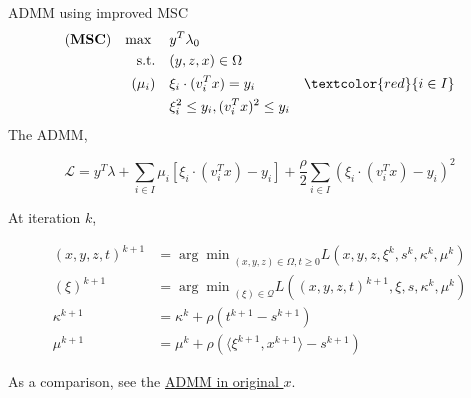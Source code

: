 \documentclass[aspectratio=1610, 9pt]{beamer}
\newcommand{\model}[1]{(\textbf{#1})}
\newcommand{\mx}{\mathbf{\max}\;}
\newcommand{\red}[1]{\textcolor{red}{#1}}
\begin{document}
\begin{frame}{ADMM using improved MSC}
  \begin{align}
    \model{MSC} \quad \mx \quad & y ^T\lambda_0                                       \\
    \mathrm{s.t.} \quad         & (y,z,x) \in \Omega                                  \\
    ( \mu_i)    \quad           & \xi_i \cdot (v_i^Tx) = y_i           & \red{i\in I} \\
                                & \xi_i^2 \le y_i,  (v_i^Tx)^2 \le y_i
  \end{align}
  The ADMM,

  \begin{equation}
    \mathcal L = y^T\lambda + \sum_{i \in I} \mu_i \left [\xi_i \cdot(v_i^Tx) - y_i\right] + \frac{\rho}{2}\sum_{i \in I} (\xi_i \cdot (v_i^Tx) - y_i)^2
  \end{equation}

  At iteration \(k\),

  \begin{align*}
    (x,y,z,t)^{k+1} & = {\arg\min}_{(x,y,z)\in\Omega, t\ge 0} L\left(x,y,z,\xi^k,s^k,\kappa^k,\mu^k\right)    \\
    (\xi)^{k+1}     & = {\arg\min}_{(\xi)\in\mathscr{Q}} L\left((x,y,z,t)^{k+1},\xi,s, \kappa^k, \mu^k\right) \\
    \kappa^{k+1}    & = \kappa^k + \rho\left(t^{k+1}-s^{k+1}\right)                                           \\
    \mu^{k+1}       & = \mu^k + \rho\left( \langle\xi^{k+1}, x^{k+1}\rangle - s^{k+1}\right)
  \end{align*}

  As a comparison, see the \hyperlink{oldad}{ADMM in original \(x\)}.
\end{frame}
\end{document}
